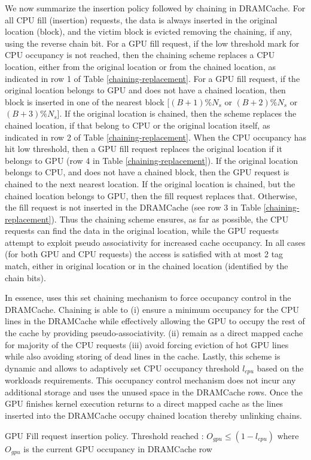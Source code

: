 \par We now summarize the insertion policy followed by chaining in DRAMCache. For all CPU fill (insertion) requests, the data is always inserted in the original location (block), and the victim block is evicted removing the chaining, if any, using the reverse chain bit. For a GPU fill request, if the low threshold mark for CPU occupancy is not reached, then the chaining scheme replaces a CPU location, either from the original location or from the chained location, as indicated in row 1 of Table \ref{chaining-replacement}. For a GPU fill request, if the original location belongs to GPU and does not have a chained location, then block is inserted in one of the nearest block [$(B+1)\%N_s$ or $(B+2)\%N_s$ or $(B+3)\%N_s$]. If the original location is chained, then the scheme replaces the chained location, if that belong to CPU or the original location itself, as indicated in row 2 of Table \ref{chaining-replacement}. When the CPU occupancy has hit low threshold, then a GPU fill request replaces the original location if it belongs to GPU (row 4 in Table \ref{chaining-replacement}). If the original location belongs to CPU, and does not have a chained block, then the GPU request is chained to the next nearest location. If the original location is chained, but the chained location belongs to GPU, then the fill request replaces that. Otherwise, the fill request is not inserted in the DRAMCache (see row 3 in Table \ref{chaining-replacement}). Thus the chaining scheme ensures, as far as possible, the CPU requests can find the data in the original location, while the GPU requests attempt to exploit pseudo associativity for increased cache occupancy. In all cases (for both GPU and CPU requests) the access is satisfied with at most 2 tag match, either in original location or in the chained location (identified by the chain bits). 


\par In essence, \cachename uses this set chaining mechanism to force occupancy control in the DRAMCache. Chaining is able to 
(i) ensure a minimum occupancy for the CPU lines in the DRAMCache while effectively allowing the GPU to occupy the rest of the cache by providing pseudo-associativity. 
(ii) remain as a direct mapped cache for majority of the CPU requests
(iii) avoid forcing eviction of hot GPU lines while also avoiding storing of dead lines in the cache.
Lastly, this scheme is dynamic and allows to adaptively set CPU occupancy threshold \textit{$l_{cpu}$} based on the workloads requirements. This occupancy control mechanism does not incur any additional storage and uses the unused space in the DRAMCache rows. Once the GPU finishes kernel execution \cachename returns to a direct mapped cache as the lines inserted into the DRAMCache occupy chained location thereby unlinking chains. 


\begin{table}[]
\centering
\small

\caption{GPU Fill request insertion policy. Threshold reached : $O_{gpu}\le(1-l_{cpu})$ where $O_{gpu}$ is the current GPU occupancy in DRAMCache row}
\label{chaining-replacement}
\end{table}
